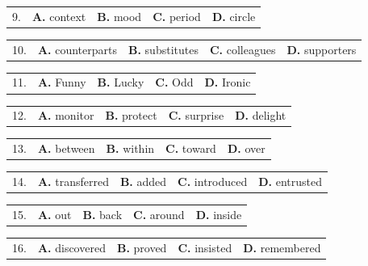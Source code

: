 \documentclass[UTF8,11pt]{ctexart}
\begin{document}
\noindent\begin{tabularx}{\linewidth}{@{}lXXXX@{}}9. & \textbf{A.} context & \textbf{B.} mood & \textbf{C.} period & \textbf{D.} circle\\\end{tabularx}\par

\noindent\begin{tabularx}{\linewidth}{@{}lXXXX@{}}10. & \textbf{A.} counterparts & \textbf{B.} substitutes & \textbf{C.} colleagues & \textbf{D.} supporters\\\end{tabularx}\par

\noindent\begin{tabularx}{\linewidth}{@{}lXXXX@{}}11. & \textbf{A.} Funny & \textbf{B.} Lucky & \textbf{C.} Odd & \textbf{D.} Ironic\\\end{tabularx}\par

\noindent\begin{tabularx}{\linewidth}{@{}lXXXX@{}}12. & \textbf{A.} monitor & \textbf{B.} protect & \textbf{C.} surprise & \textbf{D.} delight\\\end{tabularx}\par

\noindent\begin{tabularx}{\linewidth}{@{}lXXXX@{}}13. & \textbf{A.} between & \textbf{B.} within & \textbf{C.} toward & \textbf{D.} over\\\end{tabularx}\par

\noindent\begin{tabularx}{\linewidth}{@{}lXXXX@{}}14. & \textbf{A.} transferred & \textbf{B.} added & \textbf{C.} introduced & \textbf{D.} entrusted\\\end{tabularx}\par

\noindent\begin{tabularx}{\linewidth}{@{}lXXXX@{}}15. & \textbf{A.} out & \textbf{B.} back & \textbf{C.} around & \textbf{D.} inside\\\end{tabularx}\par

\noindent\begin{tabularx}{\linewidth}{@{}lXXXX@{}}16. & \textbf{A.} discovered & \textbf{B.} proved & \textbf{C.} insisted & \textbf{D.} remembered\\\end{tabularx}\par
\end{document}
